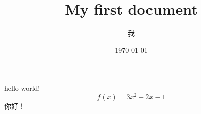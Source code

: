 \documentclass[UTF8]{ctexart}  %
\title{My first document}
\author{我}
\date{\today}
\begin{document}
    \maketitle    
    hello world!
    $$f(x)=3x^2+2x-1$$
    你好！
\end{document}
